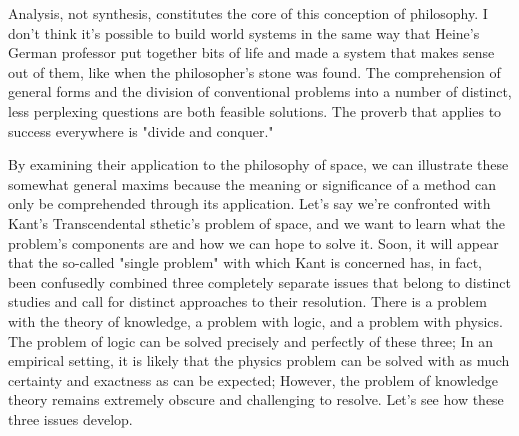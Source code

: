 \documentclass[a4paper,12pt]{book}[2004/02/16]
\theoremstyle{ilemma}
\theoremstyle{itheorem}
\theoremstyle{iother}
\theoremstyle{icorollary}
\theoremstyle{numcorollary}
\theoremstyle{idefinition}
\begin{document}
Analysis, not synthesis, constitutes the core of this conception of philosophy. I don't think it's possible to build world systems in the same way that Heine's German professor put together bits of life and made a system that makes sense out of them, like when the philosopher's stone was found. The comprehension of general forms and the division of conventional problems into a number of distinct, less perplexing questions are both feasible solutions.
The proverb that applies to success everywhere is "divide and conquer."

By examining their application to the philosophy of space, we can illustrate these somewhat general maxims because the meaning or significance of a method can only be comprehended through its application. Let's say we're confronted with Kant's Transcendental sthetic's problem of space, and we want to learn what the problem's components are and how we can hope to solve it. Soon, it will appear that the so-called "single problem" with which Kant is concerned has, in fact, been confusedly combined three completely separate issues that belong to distinct studies and call for distinct approaches to their resolution. There is a problem with the theory of knowledge, a problem with logic, and a problem with physics. The problem of logic can be solved precisely and perfectly of these three; In an empirical setting, it is likely that the physics problem can be solved with as much certainty and exactness as can be expected; However, the problem of knowledge theory remains extremely obscure and challenging to resolve. Let's see how these three issues develop.
\end{document}
